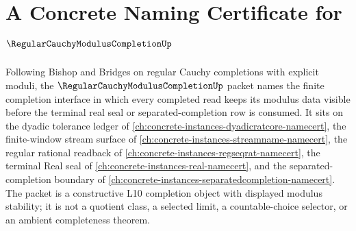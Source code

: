 \chapter{A Concrete Naming Certificate for $\RegularCauchyModulusCompletionUp$}
\label{ch:concrete-instances-regular-cauchy-modulus-completion-namecert}

Following Bishop and Bridges on regular Cauchy completions with explicit moduli, the $\RegularCauchyModulusCompletionUp$ packet names the finite completion interface in which every completed read keeps its modulus data visible before the terminal real seal or separated-completion row is consumed. It sits on the dyadic tolerance ledger of \autoref{ch:concrete-instances-dyadicratcore-namecert}, the finite-window stream surface of \autoref{ch:concrete-instances-streamname-namecert}, the regular rational readback of \autoref{ch:concrete-instances-regseqrat-namecert}, the terminal Real seal of \autoref{ch:concrete-instances-real-namecert}, and the separated-completion boundary of \autoref{ch:concrete-instances-separatedcompletion-namecert}. The packet is a constructive L10 completion object with displayed modulus stability; it is not a quotient class, a selected limit, a countable-choice selector, or an ambient completeness theorem.

